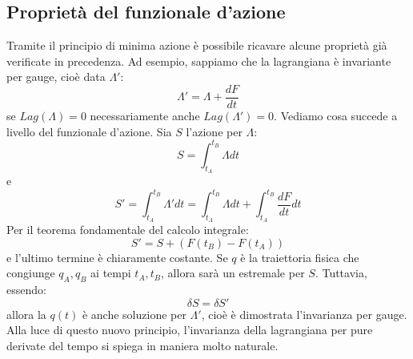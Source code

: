 \documentclass[a4paper,openany]{article}
\begin{document}
	\subsection{Proprietà del funzionale d'azione}
	Tramite il principio di minima azione è possibile ricavare alcune proprietà già verificate in precedenza. Ad esempio, sappiamo che la lagrangiana è invariante per gauge, cioè data $\Lambda'$:
	$$
	\Lambda' = \Lambda + \dfrac{dF}{dt}
	$$
	se $Lag(\Lambda)=0$ necessariamente anche $Lag(\Lambda')=0$. Vediamo cosa succede a livello del funzionale d'azione.
	Sia $S$ l'azione per $\Lambda$:
	$$
	S = \int_{t_A}^{t_B} \Lambda dt
	$$
	e 
	$$
	S' = \int_{t_A}^{t_B} \Lambda' dt = \int_{t_A}^{t_B} \Lambda dt + \int_{t_A}^{t_B} \dfrac{dF}{dt} dt
	$$
	Per il teorema fondamentale del calcolo integrale:
	$$
	S' = S + (F(t_B)-F(t_A))
	$$
	e l'ultimo termine è chiaramente costante. Se $q$ è la traiettoria fisica che congiunge $q_A, q_B$ ai tempi $t_A, t_B$, allora sarà un estremale per $S$. Tuttavia, essendo:
	$$
	\delta S = \delta S'
	$$
	allora la $q(t)$ è anche soluzione per $\Lambda'$, cioè è dimostrata l'invarianza per gauge. Alla luce di questo nuovo principio, l'invarianza della lagrangiana per pure derivate del tempo si spiega in maniera molto naturale.
\end{document}
